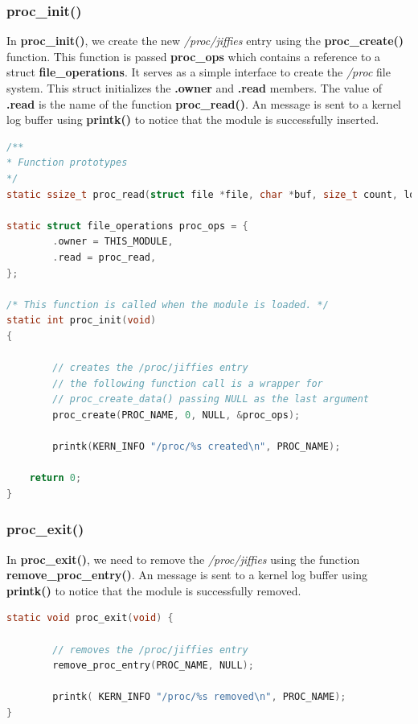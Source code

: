 \documentclass{article}
\begin{document}
    \subsubsection*{proc\_init()}
    In \textbf{proc\_init()}, we create the new \textit{/proc/jiffies} entry using the \textbf{proc\_create()} function. This function is passed \textbf{proc\_ops} which contains a reference to a struct \textbf{file\_operations}. It serves as a simple interface to create the \textit{/proc} file system. This struct initializes the \textbf{.owner} and \textbf{.read} members. The value of \textbf{.read} is the name of the function \textbf{proc\_read()}. An message is sent to a kernel log buffer using \textbf{printk()} to notice that the module is successfully inserted.

    \vspace{2pt}

    \begin{lstlisting}[language=c, caption={\textbf{proc\_init()}}]
/**
* Function prototypes
*/
static ssize_t proc_read(struct file *file, char *buf, size_t count, loff_t *pos);

static struct file_operations proc_ops = {
        .owner = THIS_MODULE,
        .read = proc_read,
};

/* This function is called when the module is loaded. */
static int proc_init(void)
{

        // creates the /proc/jiffies entry
        // the following function call is a wrapper for
        // proc_create_data() passing NULL as the last argument
        proc_create(PROC_NAME, 0, NULL, &proc_ops);

        printk(KERN_INFO "/proc/%s created\n", PROC_NAME);

    return 0;
}
    \end{lstlisting}

    \vspace{2pt}

    \subsubsection*{proc\_exit()}
    In \textbf{proc\_exit()}, we need to remove the \textit{/proc/jiffies} using the function \textbf{remove\_proc\_entry()}. An message is sent to a kernel log buffer using \textbf{printk()} to notice that the module is successfully removed.

    \vspace{2pt}

    \begin{lstlisting}[language=c, caption={\textbf{proc\_exit()}}]
static void proc_exit(void) {

        // removes the /proc/jiffies entry
        remove_proc_entry(PROC_NAME, NULL);

        printk( KERN_INFO "/proc/%s removed\n", PROC_NAME);
}
    \end{lstlisting}
\end{document}
